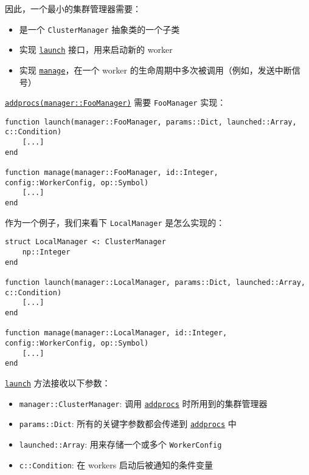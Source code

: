 因此，一个最小的集群管理器需要：



\begin{itemize}
\item 是一个 \texttt{ClusterManager} 抽象类的一个子类


\item 实现 \hyperlink{7346188534454273843}{\texttt{launch}} 接口，用来启动新的 worker


\item 实现 \hyperlink{8462349151012734144}{\texttt{manage}}，在一个 worker 的生命周期中多次被调用（例如，发送中断信号）

\end{itemize}


\hyperlink{2657399037748470653}{\texttt{addprocs(manager::FooManager)}} 需要 \texttt{FooManager} 实现：




\begin{verbatim}
function launch(manager::FooManager, params::Dict, launched::Array, c::Condition)
    [...]
end

function manage(manager::FooManager, id::Integer, config::WorkerConfig, op::Symbol)
    [...]
end
\end{verbatim}



作为一个例子，我们来看下 \texttt{LocalManager} 是怎么实现的：




\begin{verbatim}
struct LocalManager <: ClusterManager
    np::Integer
end

function launch(manager::LocalManager, params::Dict, launched::Array, c::Condition)
    [...]
end

function manage(manager::LocalManager, id::Integer, config::WorkerConfig, op::Symbol)
    [...]
end
\end{verbatim}



\hyperlink{7346188534454273843}{\texttt{launch}} 方法接收以下参数：



\begin{itemize}
\item \texttt{manager::ClusterManager}: 调用 \hyperlink{2657399037748470653}{\texttt{addprocs}} 时所用到的集群管理器


\item \texttt{params::Dict}: 所有的关键字参数都会传递到 \hyperlink{2657399037748470653}{\texttt{addprocs}} 中


\item \texttt{launched::Array}: 用来存储一个或多个 \texttt{WorkerConfig}


\item \texttt{c::Condition}: 在 workers 启动后被通知的条件变量

\end{itemize}


